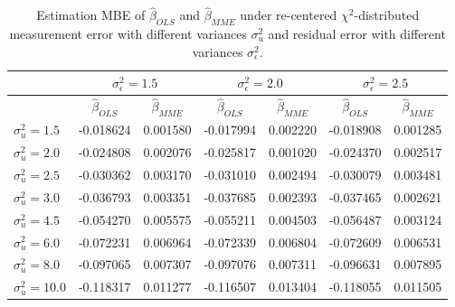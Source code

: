 \documentclass{article}
\begin{document}
\begin{table}[ht]
    \centering
    \caption{Estimation MBE of $\hat{\beta}_{OLS}$ and $\hat{\beta}_{MME}$ under re-centered $\chi^2$-distributed measurement error with different variances $\sigma^2_u$ and residual error with different variances $\sigma^2_\epsilon$.}
    \label{Tab:MBE_chi}
    \begin{tabular}[t]{lcccccc}
        \hline
        &\multicolumn{2}{c}{$\sigma^2_\epsilon=1.5$}&\multicolumn{2}{c}{$\sigma^2_\epsilon=2.0$}&\multicolumn{2}{c}{$\sigma^2_\epsilon=2.5$}\\
        \hline
        &$\hat{\beta}_{OLS}$&$\hat{\beta}_{MME}$&$\hat{\beta}_{OLS}$&$\hat{\beta}_{MME}$&$\hat{\beta}_{OLS}$&$\hat{\beta}_{MME}$\\
        \hline
        $\sigma^2_u = 1.5$&-0.018624&0.001580&-0.017994&0.002220&-0.018908&0.001285\\
        $\sigma^2_u = 2.0$&-0.024808&0.002076&-0.025817&0.001020&-0.024370&0.002517\\
        $\sigma^2_u = 2.5$&-0.030362&0.003170&-0.031010&0.002494&-0.030079&0.003481\\
        $\sigma^2_u = 3.0$&-0.036793&0.003351&-0.037685&0.002393&-0.037465&0.002621\\
        $\sigma^2_u = 4.5$&-0.054270&0.005575&-0.055211&0.004503&-0.056487&0.003124\\
        $\sigma^2_u = 6.0$&-0.072231&0.006964&-0.072339&0.006804&-0.072609&0.006531\\
        $\sigma^2_u = 8.0$&-0.097065&0.007307&-0.097076&0.007311&-0.096631&0.007895\\
        $\sigma^2_u = 10.0$&-0.118317&0.011277&-0.116507&0.013404&-0.118055&0.011505\\
        \hline
    \end{tabular}
\end{table}
\end{document}
